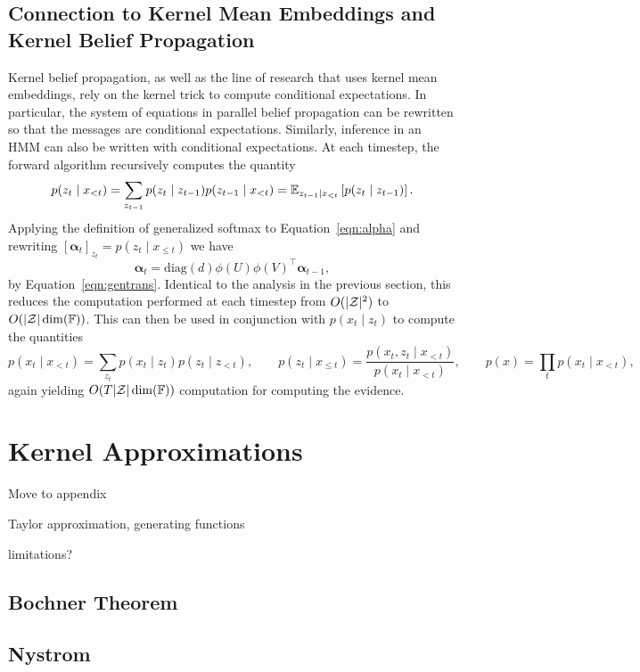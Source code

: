 \documentclass{article}
\begin{document}
\subsection{Connection to Kernel Mean Embeddings and Kernel Belief Propagation}
Kernel belief propagation, as well as the line of research that uses kernel mean embeddings,
rely on the kernel trick to compute conditional expectations.
In particular, the system of equations in parallel belief propagation can be
rewritten so that the messages are conditional expectations.
Similarly, inference in an HMM can also be written with conditional expectations.
At each timestep, the forward algorithm recursively computes the quantity
\begin{equation}
\label{eqn:alpha}
p(z_t \mid x_{<t})
= \sum_{z_{t-1}} p(z_t \mid z_{t-1})p(z_{t-1}\mid x_{<t})
= \mathbb{E}_{z_{t-1}\mid x_{<t}}\left[p(z_t \mid z_{t-1})\right].
\end{equation}
Applying the definition of generalized softmax to Equation~\ref{eqn:alpha}
and rewriting $[\bm\alpha_t]_{z_t} = p(z_t \mid x_{\le t})$
we have
\begin{equation}
\bm\alpha_t = \textrm{diag}(d)\phi(U)\phi(V)^\top\bm\alpha_{t-1},
\end{equation}
by Equation~\ref{eqn:gentrans}.
Identical to the analysis in the previous section, this reduces the computation
performed at each timestep from $O(|\mathcal{Z}|^2)$ to $O(|\mathcal{Z}|\dim(\mathbb{F}))$.
This can then be used in conjunction with $p(x_t \mid z_t)$ to compute
the quantities
$$
p(x_t \mid x_{<t}) = \sum_{z_t}p(x_t \mid z_t)p(z_t \mid z_{<t}),
\qquad
p(z_t \mid x_{\le t}) = \frac{p(x_t, z_t \mid x_{<t})}{p(x_t \mid x_{<t})},
\qquad
p(x) = \prod_t p(x_t \mid x_{<t}),
$$
again yielding $O(T|\mathcal{Z}|\dim(\mathbb{F}))$ computation for computing the evidence.


\section{Kernel Approximations}
Move to appendix

Taylor approximation, generating functions

limitations?
\subsection{Bochner Theorem}
\subsection{Nystrom}
\end{document}
